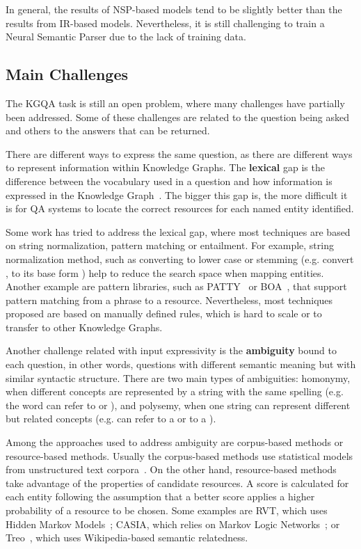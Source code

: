 In general, the results of NSP-based models tend to be slightly better than the results from 
IR-based models. Nevertheless, it is still challenging to train a Neural Semantic Parser due to 
the lack of training data.

\subsection{Main Challenges}
\label{cap2:theoFrame/qakg/challenges}
The KGQA task is still an open problem, where many challenges have partially been addressed. 
Some of these challenges are related to the question being asked and others to the answers that 
can be returned. 

There are different ways to express the same question, as there are different ways to represent 
information within Knowledge Graphs. The \textbf{lexical} gap is the difference between the 
vocabulary used in a question and how information is expressed in the Knowledge 
Graph~\cite{semPar:lexical-gap-HakimovUWC15}. The bigger this gap is, the more difficult it is 
for QA systems to locate the correct resources for each named entity identified. 

Some work has tried to address the lexical gap, where most techniques are based on string 
normalization, pattern matching or entailment. For example, string normalization method, such 
as converting to lower case or stemming (e.g. convert , to its base form 
) help to reduce the search space when mapping entities. Another example are 
pattern libraries, such as PATTY~\cite{qa:NakasholeWS12} or BOA~\cite{qa:GerberN12}, that 
support pattern matching from a phrase to a resource. Nevertheless, most techniques proposed 
are based on manually defined rules, which is hard to scale or to transfer to other Knowledge 
Graphs.

Another challenge related with input expressivity is the \textbf{ambiguity} bound to each 
question, in other words, questions with different semantic meaning but with similar syntactic 
structure. There are two main types of ambiguities: homonymy, when different concepts are 
represented by a string with the same spelling (e.g. the word  can refer to 
 or ), and polysemy, when one string can 
represent different but related concepts (e.g.  can refer to a 
 or to a ). 

Among the approaches used to address ambiguity are corpus-based methods or resource-based 
methods. Usually the corpus-based methods use statistical models from unstructured text 
corpora~\cite{qa:shirai1997,qa:ShenYYJLC11}. On the other hand, resource-based methods take 
advantage of the \RDF{} properties of candidate resources. A score is calculated for each entity 
following the assumption that a better score applies a higher probability of a resource to be 
chosen. Some examples are RVT, which uses Hidden Markov Models~\cite{qa:GiannoneBB13}; CASIA, 
which relies on Markov Logic Networks~\cite{qa:shizhu2014casia}; or Treo~\cite{qa:freitas2011treo,
qa:FreitasOOSC13}, which uses Wikipedia-based semantic relatedness.

